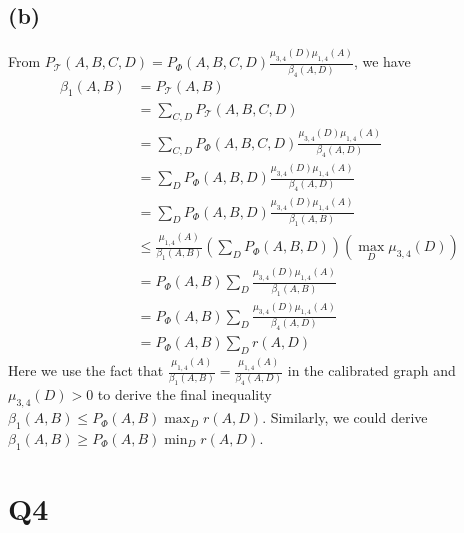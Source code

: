 \documentclass{article}
\begin{document}
\subsection*{(b)}
From $P_{\mathcal{T}}(A,B,C,D) = P_{\Phi}(A,B,C,D)\frac{\mu_{3,4}(D)\mu_{1,4}(A)}{\beta_4(A,D)}$, we have
\begin{equation}
    \begin{split}
        \beta_1(A,B) &= P_{\mathcal{T}}(A,B)\\
                & = \sum_{C,D}P_{\mathcal{T}}(A,B,C,D)\\
                & = \sum_{C,D}P_{\Phi}(A,B,C,D)\frac{\mu_{3,4}(D)\mu_{1,4}(A)}{\beta_4(A,D)}\\
                & = \sum_{D}P_{\Phi}(A,B,D)\frac{\mu_{3,4}(D)\mu_{1,4}(A)}{\beta_4(A,D)}\\
                & = \sum_{D}P_{\Phi}(A,B,D)\frac{\mu_{3,4}(D)\mu_{1,4}(A)}{\beta_1(A,B)}\\
                & \leq \frac{\mu_{1,4}(A)}{\beta_1(A,B)} (\sum_{D}P_{\Phi}(A,B,D))(\max_{D}\mu_{3,4}(D))\\
                & = P_{\Phi}(A,B)\sum_{D}\frac{\mu_{3,4}(D)\mu_{1,4}(A)}{\beta_1(A,B)}\\
                & = P_{\Phi}(A,B)\sum_{D}\frac{\mu_{3,4}(D)\mu_{1,4}(A)}{\beta_4(A,D)}\\
                & = P_{\Phi}(A,B)\sum_{D} r(A,D)
    \end{split}
\end{equation}
Here we use the fact that $\frac{\mu_{1,4}(A)}{\beta_1(A,B)}= \frac{\mu_{1,4}(A)}{\beta_4(A,D)}$ in the calibrated graph and $\mu_{3,4}(D) > 0$
to derive the final inequality $\beta_1(A,B) \leq P_{\Phi}(A,B)\max_{D} r(A,D)$. Similarly, we could derive $\beta_1(A,B) \geq P_{\Phi}(A,B)\min_{D} r(A,D)$.


\section*{Q4}
\end{document}

